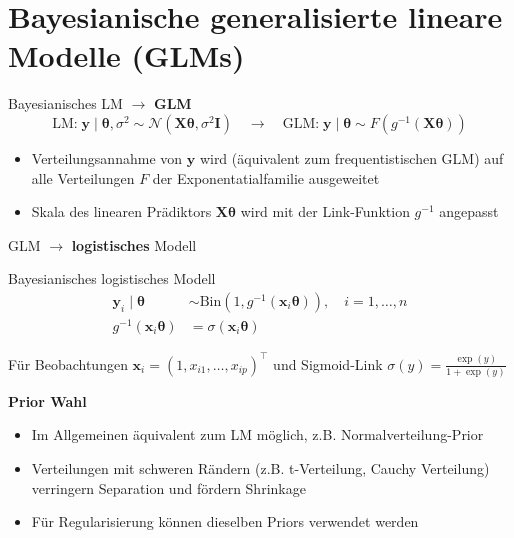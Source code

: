 \documentclass[
  ignorenonframetext,
  aspectratio=169,
]{beamer}
\providecommand{\tightlist}{%
  \setlength{\itemsep}{0pt}\setlength{\parskip}{0pt}}
\newcommand{\bx}{\bm{x}}
\newcommand{\by}{\bm{y}}
\newcommand{\bI}{\bm{I}}
\newcommand{\bX}{\bm{X}}
\newcommand{\Ncal}{\mathcal{N}}
\newcommand{\ssd}{\sigma^2}
\newcommand{\btheta}{\bm{\theta}}
\begin{document}
\section{\texorpdfstring{Bayesianische \textbf{generalisierte} lineare
Modelle
(GLMs)}{Bayesianische generalisierte lineare Modelle (GLMs)}}\label{bayesianische-generalisierte-lineare-modelle-glms}

\begin{frame}{Bayesianisches LM \(\to\) \textbf{GLM}}
\protect{}\label{bayesianisches-lm-to-glm}
\[\text{LM:} \; \by \mid \btheta, \ssd \sim \Ncal(\bX \btheta, \ssd \bI) \quad
\to \quad \text{GLM:} \; \by \mid \btheta \sim F(g^{-1}(\bX \btheta))\]

\begin{itemize}
\tightlist
\item
  Verteilungsannahme von \(\by\) wird (äquivalent zum frequentistischen
  GLM) auf alle Verteilungen \(F\) der Exponentatialfamilie ausgeweitet
\item
  Skala des linearen Prädiktors \(\bX \btheta\) wird mit der
  Link-Funktion \(g^{-1}\) angepasst
\end{itemize}
\end{frame}

\begin{frame}{GLM \(\to\) \textbf{logistisches} Modell}
\protect{}\label{glm-to-logistisches-modell}
\begin{block}{Bayesianisches logistisches Modell}
\protect{}\label{bayesianisches-logistisches-modell}
\[
\begin{aligned}
  \by_i \mid \btheta &\sim \text{Bin}(1, g^{-1}(\bx_i \btheta)), \quad i = 1, \dots, n \\
  g^{-1}(\bx_i \btheta) &= \sigma(\bx_i \btheta)
\end{aligned}
\]

Für Beobachtungen \(\bx_i = (1, x_{i1}, \dots, x_{ip})^\top\) und
Sigmoid-Link \(\sigma(y) = \frac{\exp(y)}{1 + \exp(y)}\)
\end{block}

\textbf{Prior Wahl}

\begin{itemize}
\tightlist
\item
  Im Allgemeinen äquivalent zum LM möglich, z.B. Normalverteilung-Prior
\item
  Verteilungen mit schweren Rändern (z.B. t-Verteilung, Cauchy
  Verteilung) verringern Separation und fördern Shrinkage
  \autocite{gelman_weakly_2008,ghosh_use_2017}
\item
  Für Regularisierung können dieselben Priors verwendet werden
  \autocite{ohara_review_2009,fahrmeir_bayesian_2010,van_erp_shrinkage_2019}
\end{itemize}
\end{frame}
\end{document}
